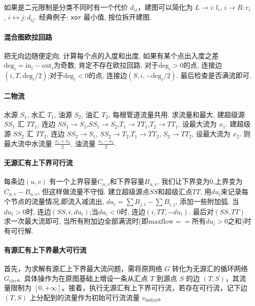 如果是二元限制是分类不同时有一个代价 $d_{ij}$，建图可以简化为 $L\rightarrow i: l_i$, $i \rightarrow R: r_i$,
$i \leftrightarrow j: d_{ij}$. 经典例子: \texttt{xor} 最小值, 按位拆开建图.

\paragraph{混合图欧拉回路}把无向边随便定向, 计算每个点的入度和出度, 如果有某个点出入度之差$\mathrm{deg}_i=\mathrm{in}_i-\mathrm{out}_i$为奇数, 肯定不存在欧拉回路. 对于$\mathrm{deg}_i>0$的点, 连接边$(i,T,\mathrm{deg}_i/2)$;对于$\mathrm{deg}_i<0$的点, 连接边$(S,i,-\mathrm{deg}_i/2)$. 最后检查是否满流即可. 
\paragraph{二物流}
水源 $S_1$, 水汇 $T_1$, 油源 $S_2$, 油汇 $T_2$, 每根管道流量共用. 求流量和最大.
建超级源 $SS_1$ 汇 $TT_1$, 连边 $SS_1\to S_1$,$SS_1\to S_2$,$T_1\to TT_1$,$T_2 \to TT_1$, 设最大流为 $x_1$.
建超级源 $SS_2$ 汇 $TT_2$, 连边 $SS_2 \to S_1$, $SS_2\to T_2$,$T_1\to TT_2$, $S_2\to TT_2$, 设最大流为 $x_2$.
则最大流中水流量 $\frac{x_1 + x_2}{2}$, 油流量 $\frac{x_1-x_2}{2}$.

\paragraph{无源汇有上下界可行流}

每条边$(u,v)$ 有一个上界容量$C_{u,v}$和下界容量$B_{u,v}$, 我们让下界变为$0$,上界变为$C_{u,v}-B_{u,v}$, 但这样做流量不守恒. 建立超级源点$SS$和超级汇点$TT$, 用$du_i$来记录每个节点的流量情况,即流入减流出, $du_i=\sum B_{j,i}-\sum B_{i,j}$, 添加一些附加弧. 当$du_i>0$时, 连边$(SS,i,du_i)$;当$du_i<0$时, 连边$(i,TT,-du_i)$. 最后对$(SS,TT)$求一次最大流即可, 当所有附加边全部满流时(即$\mathrm{maxflow}==\text{所有}du_i>0\text{之和}$)时有可行解.
\paragraph{有源汇有上下界最大可行流}
首先，为求解有源汇上下界最大流问题，需将原网络 $G$ 转化为无源汇的循环网络 $G_{\text{circ}}$。具体操作为在原图基础上增设一条从汇点 $T$ 到源点 $S$ 的边 $(T, S)$，其流量限制为 $[0, +\infty]$。接着，执行无源汇有上下界可行流，若存在可行流，记下边 $(T, S)$ 上分配到的流量作为初始可行流流量 $v_{\text{initial}}$。

